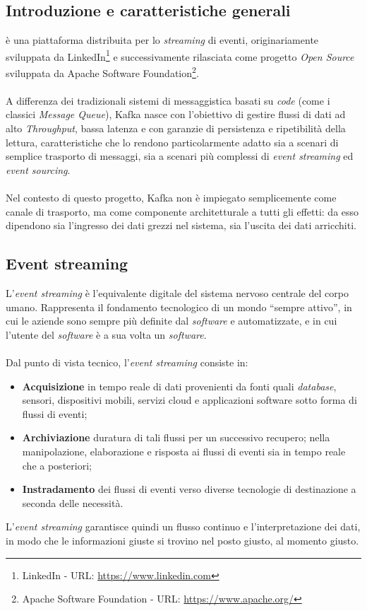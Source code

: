 \subsection{Introduzione e caratteristiche generali}
 è una piattaforma distribuita per lo \textit{streaming} di eventi, originariamente sviluppata da LinkedIn\footnote{LinkedIn - URL: \url{https://www.linkedin.com}} e successivamente rilasciata come progetto \textit{\gls{Open Source}} sviluppata da Apache Software Foundation\footnote{Apache Software Foundation - URL: \url{https://www.apache.org/}}. \\ \\
A differenza dei tradizionali sistemi di messaggistica basati su \textit{code} (come i classici \textit{Message Queue}), Kafka nasce con l'obiettivo di gestire flussi di dati ad alto \textit{\gls{Throughput}}, bassa latenza e con garanzie di persistenza e ripetibilità della lettura, caratteristiche che lo rendono particolarmente adatto sia a scenari di semplice trasporto di messaggi, sia a scenari più complessi di \textit{event streaming} ed \textit{event sourcing}. \\ \\
Nel contesto di questo progetto, Kafka non è impiegato semplicemente come canale di trasporto, ma come componente architetturale a tutti gli effetti: da esso dipendono sia l'ingresso dei dati grezzi nel sistema, sia l'uscita dei dati arricchiti.

\subsection{Event streaming}
\label{Event Streaming}
L'\textit{event streaming} è l'equivalente digitale del sistema nervoso centrale del corpo umano. Rappresenta il fondamento tecnologico di un mondo “sempre attivo”, in cui le aziende sono sempre più definite dal \textit{software} e automatizzate, e in cui l'utente del \textit{software} è a sua volta un \textit{software}. \\ \\
Dal punto di vista tecnico, l'\textit{event streaming} consiste in:
\begin{itemize}
    \item \textbf{Acquisizione} in tempo reale di dati provenienti da fonti quali \textit{database}, sensori, dispositivi mobili, servizi cloud e applicazioni software sotto forma di flussi di eventi; 
    \newpage
    \item \textbf{Archiviazione} duratura di tali flussi per un successivo recupero; nella manipolazione, elaborazione e risposta ai flussi di eventi sia in tempo reale che a posteriori; 
    \item \textbf{Instradamento} dei flussi di eventi verso diverse tecnologie di destinazione a seconda delle necessità.
\end{itemize}
L'\textit{event streaming} garantisce quindi un flusso continuo e l'interpretazione dei dati, in modo che le informazioni giuste si trovino nel posto giusto, al momento giusto.

